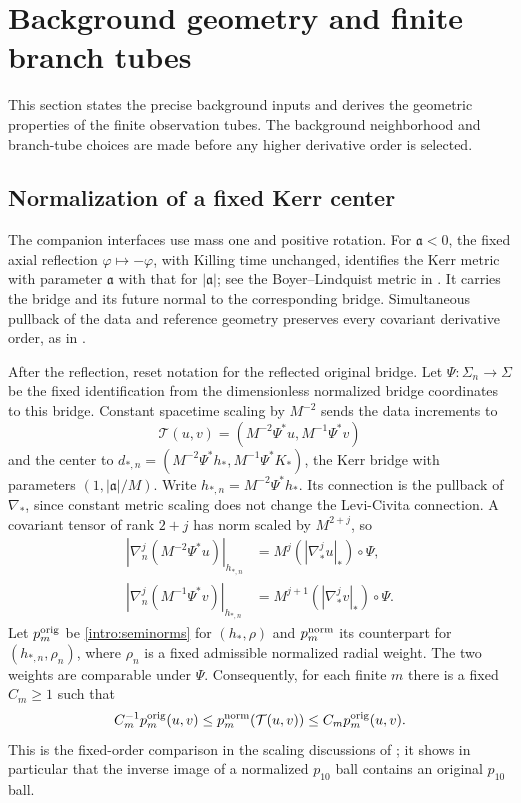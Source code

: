 \section{Background geometry and finite branch tubes}\label{sec:background}

This section states the precise background inputs and derives the
geometric properties of the finite observation tubes. The background
neighborhood and branch-tube choices are made before any higher
derivative order is selected.

\subsection{Normalization of a fixed Kerr center}\label{bg:normalization}

The companion interfaces use mass one and positive rotation. For
$\mathfrak a<0$, the fixed axial reflection $\varphi\mapsto-\varphi$,
with Killing time unchanged, identifies the Kerr metric with parameter
$\mathfrak a$ with that for $|\mathfrak a|$; see the Boyer--Lindquist
metric in \cite[Section~7.1]{KerrCTwo}. It carries the bridge and its
future normal to the corresponding bridge. Simultaneous pullback of
the data and reference geometry preserves every covariant derivative
order, as in \cite[Section~2]{KerrCOne}.

After the reflection, reset notation for the reflected original bridge.
Let $\Psi:\Sigma_n\to\Sigma$ be the fixed identification from the
dimensionless normalized bridge coordinates to this bridge.
Constant spacetime scaling by $M^{-2}$ sends the data
increments to
\[
 \mathcal T(u,v)=(M^{-2}\Psi^*u,M^{-1}\Psi^*v)
\]
and the center to
$d_{*,n}=(M^{-2}\Psi^*h_*,M^{-1}\Psi^*K_*)$, the Kerr bridge with
parameters $(1,|\mathfrak a|/M)$. Write $h_{*,n}=M^{-2}\Psi^*h_*$.
Its connection is
the pullback of $\nabla_*$, since constant metric scaling does not
change the Levi-Civita connection. A covariant tensor of rank $2+j$
has norm scaled by $M^{2+j}$, so
\[
\begin{split}
 |\nabla_n^j(M^{-2}\Psi^*u)|_{h_{*,n}}
   &=M^j(|\nabla_*^ju|_*)\circ\Psi,\\
 |\nabla_n^j(M^{-1}\Psi^*v)|_{h_{*,n}}
   &=M^{j+1}(|\nabla_*^jv|_*)\circ\Psi .
\end{split}
\]
Let $p_m^{\rm orig}$ be \eqref{intro:seminorms} for $(h_*,\rho)$ and
$p_m^{\rm norm}$ its counterpart for $(h_{*,n},\rho_n)$, where $\rho_n$
is a fixed admissible normalized radial weight. The two weights are
comparable under $\Psi$. Consequently,
for each finite $m$ there is a fixed $C_m\ge1$ such that
\begin{equation}\label{bg:seminorm-scaling}
 C_m^{-1}p_m^{\rm orig}(u,v)
 \le p_m^{\rm norm}(\mathcal T(u,v))
 \le C_m p_m^{\rm orig}(u,v).
\end{equation}
This is the fixed-order comparison in the scaling discussions of
\cite{KerrCTwo,KerrCOne}; it shows in particular that the inverse image
of a normalized $p_{10}$ ball contains an original $p_{10}$ ball.

